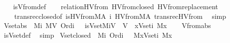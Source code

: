 \begin{isabellebody}
%
\isadelimproof
\ \ %
\endisadelimproof
%
\isatagproof
{}\isamarkupfalse%
\ is{\isacharunderscore}{\kern0pt}Vfrom{\isacharunderscore}{\kern0pt}def\isanewline
\ \ \isamarkupfalse%
\ relation{}{\isacharunderscore}{\kern0pt}HVfrom\ HVfrom{\isacharunderscore}{\kern0pt}closed\ HVfrom{\isacharunderscore}{\kern0pt}replacement\ \isanewline
\ \ \ \ transrec{\isacharunderscore}{\kern0pt}closed{\isacharbrackleft}{\kern0pt}of\ {\isachardoublequoteopen}is{\isacharunderscore}{\kern0pt}HVfrom{\isacharparenleft}{\kern0pt}M{\isacharcomma}{\kern0pt}A{\isacharparenright}{\kern0pt}{\isachardoublequoteclose}\ i\ {\isachardoublequoteopen}HVfrom{\isacharparenleft}{\kern0pt}M{\isacharcomma}{\kern0pt}A{\isacharparenright}{\kern0pt}{\isachardoublequoteclose}{\isacharbrackright}{\kern0pt}\ transrec{\isacharunderscore}{\kern0pt}HVfrom\ \isamarkupfalse%
\ simp%
\endisatagproof
{\isafoldproof}%
%
\isadelimproof
\isanewline
%
\endisadelimproof
\isanewline
{}\isamarkupfalse%
\ Vset{\isacharunderscore}{\kern0pt}abs{\isacharcolon}{\kern0pt}\ {\isachardoublequoteopen}{\isasymlbrakk}\ M{\isacharparenleft}{\kern0pt}i{\isacharparenright}{\kern0pt}{\isacharsemicolon}{\kern0pt}\ M{\isacharparenleft}{\kern0pt}V{\isacharparenright}{\kern0pt}{\isacharsemicolon}{\kern0pt}\ Ord{\isacharparenleft}{\kern0pt}i{\isacharparenright}{\kern0pt}\ {\isasymrbrakk}\ {\isasymLongrightarrow}\ is{\isacharunderscore}{\kern0pt}Vset{\isacharparenleft}{\kern0pt}M{\isacharcomma}{\kern0pt}i{\isacharcomma}{\kern0pt}V{\isacharparenright}{\kern0pt}\ {\isasymlongleftrightarrow}\ V\ {\isacharequal}{\kern0pt}\ {\isacharbraceleft}{\kern0pt}x{\isasymin}Vset{\isacharparenleft}{\kern0pt}i{\isacharparenright}{\kern0pt}{\isachardot}{\kern0pt}\ M{\isacharparenleft}{\kern0pt}x{\isacharparenright}{\kern0pt}{\isacharbraceright}{\kern0pt}{\isachardoublequoteclose}\isanewline
%
\isadelimproof
\ \ %
\endisadelimproof
%
\isatagproof
{}\isamarkupfalse%
\ Vfrom{\isacharunderscore}{\kern0pt}abs\ \isamarkupfalse%
\ is{\isacharunderscore}{\kern0pt}Vset{\isacharunderscore}{\kern0pt}def\ \isamarkupfalse%
\ simp%
\endisatagproof
{\isafoldproof}%
%
\isadelimproof
\isanewline
%
\endisadelimproof
\isanewline
{}\isamarkupfalse%
\ Vset{\isacharunderscore}{\kern0pt}closed{\isacharcolon}{\kern0pt}\ {\isachardoublequoteopen}{\isasymlbrakk}\ M{\isacharparenleft}{\kern0pt}i{\isacharparenright}{\kern0pt}{\isacharsemicolon}{\kern0pt}\ Ord{\isacharparenleft}{\kern0pt}i{\isacharparenright}{\kern0pt}\ {\isasymrbrakk}\ {\isasymLongrightarrow}\ M{\isacharparenleft}{\kern0pt}{\isacharbraceleft}{\kern0pt}x{\isasymin}Vset{\isacharparenleft}{\kern0pt}i{\isacharparenright}{\kern0pt}{\isachardot}{\kern0pt}\ M{\isacharparenleft}{\kern0pt}x{\isacharparenright}{\kern0pt}{\isacharbraceright}{\kern0pt}{\isacharparenright}{\kern0pt}{\isachardoublequoteclose}\isanewline

\end{isabellebody}
